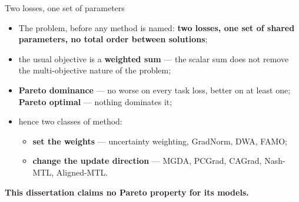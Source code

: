 \documentclass{beamer}
\begin{document}
\begin{frame}{Two losses, one set of parameters}
    \begin{itemize}\setlength{\itemsep}{4pt}
        \item The problem, before any method is named: \textbf{two losses, one set of shared
              parameters, no total order between solutions};
        \item the usual objective is a \textbf{weighted sum} --- the scalar sum does not remove
              the multi-objective nature of the problem;
        \item \textbf{Pareto dominance} --- no worse on every task loss, better on at least one;
              \textbf{Pareto optimal} --- nothing dominates it;
        \item hence two classes of method:
        \begin{itemize}\setlength{\itemsep}{2pt}
            \item \textbf{set the weights} --- uncertainty weighting, GradNorm, DWA, FAMO;
            \item \textbf{change the update direction} --- MGDA, PCGrad, CAGrad, Nash-MTL,
                  Aligned-MTL.
        \end{itemize}
    \end{itemize}

    \vfill
    \begin{alertblock}{}
        \centering\textbf{This dissertation claims no Pareto property for its models.}
    \end{alertblock}
\end{frame}
\end{document}
